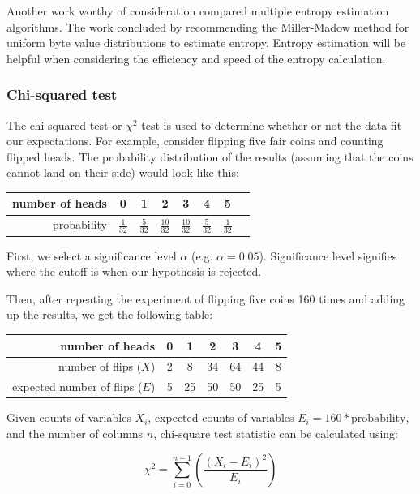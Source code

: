 \documentclass[
  digital, %
  color,   %
  oneside, %
  lof,     %
  nolot,     %
]{fithesis4}
\begin{document}
Another work worthy of consideration\cite{fiallegon19} compared multiple entropy estimation algorithms.
The work concluded by recommending the Miller-Madow method for uniform byte value distributions to estimate entropy.
Entropy estimation will be helpful when considering the efficiency and speed of the entropy calculation.

\subsubsection{Chi-squared test}
\label{sss:chi2-test}

The chi-squared test or $\chi^2$ test is used to determine whether or not the data fit our expectations.\cite{pearson00}
For example, consider flipping five fair coins and counting flipped heads.
The probability distribution of the results (assuming that the coins cannot land on their side) would look like this:
\begin{center}
    \begin{tabular}{ r | c c c c c c c }
        number of heads & 0 & 1 & 2 & 3 & 4 & 5 \\ \hline
        probability & $\frac{1}{32}$ & $\frac{5}{32}$ & $\frac{10}{32}$ & $\frac{10}{32}$ & $\frac{5}{32}$ & $\frac{1}{32}$
    \end{tabular}
\end{center}

First, we select a significance level $\alpha$ (e.g. $\alpha = 0.05$).
Significance level signifies where the cutoff is when our hypothesis is rejected.

Then, after repeating the experiment of flipping five coins 160 times and adding up the results, we get the following table: 
\begin{center}
    \begin{tabular}{r | c c c c c c}
         number of heads & 0 & 1 & 2 & 3 & 4 & 5 \\ \hline
         number of flips ($X$) & 2 & 8 & 34 & 64 & 44 & 8 \\
         expected number of flips ($E$) & 5 & 25 & 50 & 50 & 25 & 5
    \end{tabular}
\end{center}

Given counts of variables $X_i$, expected counts of variables $E_i = 160 * \text{probability}$, and the number of columns $n$, chi-square test statistic can be calculated using: 

\begin{equation}
  \chi^2 = \sum^{n - 1}_{i = 0}{\left(\frac{(X_i - E_i)^2}{E_i}\right)}
  \label{eq:chi2-statistic}
\end{equation}
\end{document}
